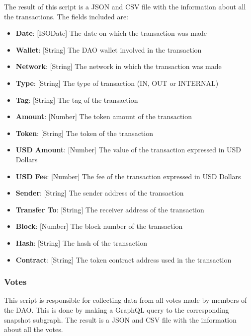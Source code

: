 \documentclass[MSE,Master,english]{twbook}%
\begin{document}
The result of this script is a JSON and CSV file with the information about all the transactions. The fields included are:
\begin{itemize}
  \item \textbf{Date}: [ISODate] The date on which the transaction was made
  \item \textbf{Wallet}: [String] The DAO wallet involved in the transaction
  \item \textbf{Network}: [String] The network in which the transaction was made
  \item \textbf{Type}: [String] The type of transaction (IN, OUT or INTERNAL)
  \item \textbf{Tag}: [String] The tag of the transaction
  \item \textbf{Amount}: [Number] The token amount of the transaction
  \item \textbf{Token}: [String] The token of the transaction
  \item \textbf{USD Amount}: [Number] The value of the transaction expressed in USD Dollars
  \item \textbf{USD Fee}: [Number] The fee of the transaction expressed in USD Dollars
  \item \textbf{Sender}: [String] The sender address of the transaction
  \item \textbf{Transfer To}: [String] The receiver address of the transaction
  \item \textbf{Block}: [Number] The block number of the transaction
  \item \textbf{Hash}: [String] The hash of the transaction
  \item \textbf{Contract}: [String] The token contract address used in the transaction
\end{itemize}

\subsubsection{Votes}
This script is responsible for collecting data from all votes made by members of the DAO. This is done by making a GraphQL query to the corresponding snapshot subgraph. The result is a JSON and CSV file with the information about all the votes. \\
\end{document}
